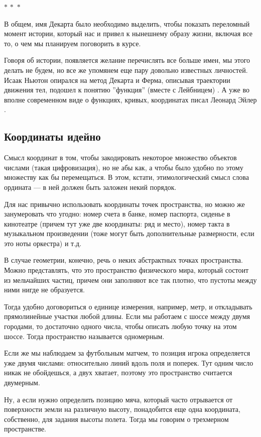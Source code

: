 \documentclass[a4paper,12pt]{article}
\newcommand{\threestars}{\begin{center}$ {\ast}\,{\ast}\,{\ast} $\end{center}}
\newcounter{th-counter}
\begin{document}
\threestars
В общем, имя Декарта было необходимо выделить, чтобы показать переломный момент истории, который нас и привел к нынешнему образу жизни, включая все то, о чем мы планируем поговорить в курсе.

Говоря об истории, появляется желание перечислять все больше имен, мы этого делать не будем, но все же упомянем еще пару довольно известных личностей. Исаак Ньютон опирался на метод Декарта и Ферма, описывая траектории движения тел, подошел к понятию ''функция'' (вместе с Лейбницем) \cite{NewtonMathWorks}. А уже во вполне современном виде о функциях, кривых, координатах писал Леонард Эйлер \cite{EulerInfiniteV1}.

\subsection*{Координаты идейно}
Смысл координат в том, чтобы закодировать некоторое множество объектов числами (такая цифровизация), но не абы как, а чтобы было удобно по этому множеству как бы перемещаться. В этом, кстати, этимологический смысл слова ордината --- в ней должен быть заложен некий порядок.

Для нас привычно использовать координаты точек пространства, но можно же занумеровать что угодно: номер счета в банке, номер паспорта, сиденье в кинотеатре (причем тут уже две координаты: ряд и место), номер такта в музыкальном произведении (тоже могут быть дополнительные размерности, если это ноты оркестра) и т.д.

В случае геометрии, конечно, речь о неких абстрактных точках пространства. Можно представлять, что это пространство физического мира, который состоит из мельчайших частиц, причем они заполняют все так плотно, что пустоты между ними нигде не образуется.

Тогда удобно договориться о единице измерения, например, метр, и откладывать прямолинейные участки любой длины. Если мы работаем с шоссе между двумя городами, то достаточно одного числа, чтобы описать любую точку на этом шоссе. Тогда пространство называется одномерным.

Если же мы наблюдаем за футбольным матчем, то позиция игрока определяется уже двумя числами: относительно линий вдоль поля и поперек. Тут одним число никак не обойдешься, а двух хватает, поэтому это пространство считается двумерным.

Ну, а если нужно определить позицию мяча, который часто отрывается от поверхности земли на различную высоту, понадобится еще одна координата, собственно, для задания высоты полета. Тогда мы говорим о трехмерном пространстве.
\end{document}
